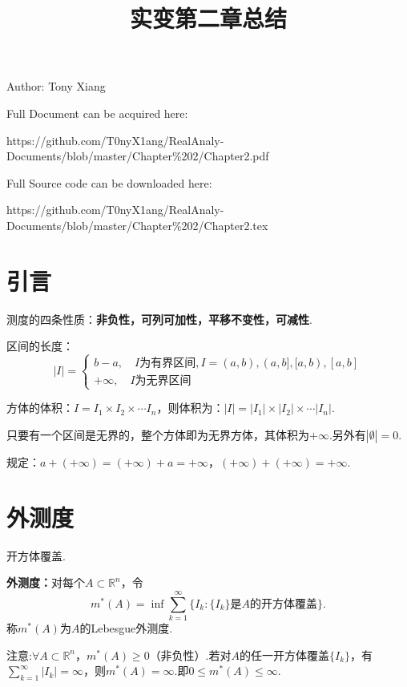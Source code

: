\documentclass[bwprint, withoutpreface]{cumcmthesis}
\title{实变第二章总结}
\begin{document}
\maketitle
\noindent Author: Tony Xiang

\noindent Full Document can be acquired here: 

\noindent https://github.com/T0nyX1ang/RealAnaly-Documents/blob/master/Chapter\%202/Chapter2.pdf

\noindent Full Source code can be downloaded here:

\noindent https://github.com/T0nyX1ang/RealAnaly-Documents/blob/master/Chapter\%202/Chapter2.tex

\section{引言}
\indent 测度的四条性质：\textbf{非负性，可列可加性，平移不变性，可减性}.

区间的长度：
\begin{equation*}
	|I| = 
	\begin{cases}
		b - a, \quad \mbox{$I$为有界区间}, I = (a, b), (a, b], [a, b), [a, b] \\
		+\infty, \quad \mbox{$I$为无界区间}
	\end{cases}	
\end{equation*}

方体的体积：$I = I_1 \times I_2 \times \cdots I_n$，则体积为：$|I| = |I_1| \times |I_2| \times \cdots |I_n|$.

只要有一个区间是无界的，整个方体即为无界方体，其体积为$+\infty$.另外有$|\emptyset| = 0$.

规定：$a + (+\infty) = (+\infty) + a = +\infty$，$(+\infty) + (+\infty) = +\infty$.

\section{外测度}
\indent 开方体覆盖.

\textbf{外测度：}对每个$A \subset \mathbb{R}^n$，令
\begin{equation*}
	m^*(A) = \inf{\sum_{k = 1}^{\infty}\{{I_k}: \{I_k\} \mbox{是$A$的开方体覆盖}\}}.
\end{equation*}
称$m^*(A)$为$A$的Lebesgue外测度.

注意:$\forall A \subset \mathbb{R}^n$，$m^*(A) \geqslant 0$（非负性）.若对$A$的任一开方体覆盖$\{I_k\}$，有$\sum_{k = 1}^{\infty}|I_k| = \infty$，则$m^*(A) = \infty$.即$0 \leqslant m^*(A) \leqslant \infty$.
\end{document}
